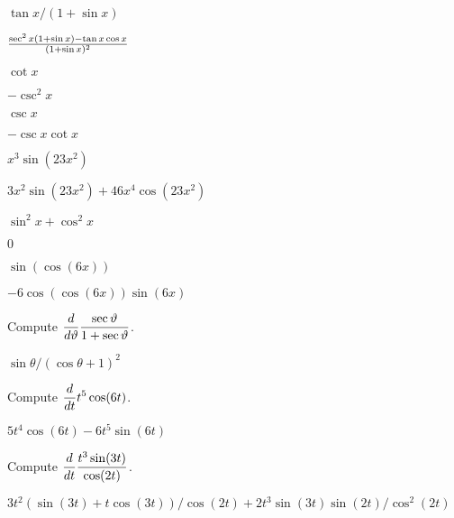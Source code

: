 \begin{exercises}
\begin{exercise} $\tan x/(1+\sin x)$
\begin{answer} ${\sec^2 x(1+\sin x)-\tan x \cos x\over (1+\sin x)^2}$
\end{answer}\end{exercise}

\begin{exercise} $\cot x$
\begin{answer} $ -\csc^2 x$
\end{answer}\end{exercise}

\begin{exercise} $\csc x$
\begin{answer} $ -\csc x\cot x$
\end{answer}\end{exercise}

\begin{exercise} $x^3 \sin (23x^2 )$
\begin{answer} $3x^2\sin(23x^2)+46x^4\cos(23x^2)$
\end{answer}\end{exercise}

\begin{exercise} $\sin ^2 x + \cos ^2 x$
 \begin{answer} $0$
\end{answer}\end{exercise}

\begin{exercise}  $\sin (\cos (6x) )$
 \begin{answer} $-6\cos(\cos(6x))\sin(6x)$
\end{answer}\end{exercise}

\endtwocol

\begin{exercise} Compute $\displaystyle{d\over d\vartheta}{\sec \vartheta\over 1+\sec \vartheta}$.
 \begin{answer} $\sin\theta/(\cos\theta+1)^2$
\end{answer}\end{exercise}

\begin{exercise} Compute $\displaystyle{d\over dt}t^5 \cos (6t)$.
\begin{answer} $5t^4\cos(6t)-6t^5\sin(6t)$
\end{answer}\end{exercise}

\begin{exercise} Compute $\displaystyle{d\over dt}{t^3 \sin (3t)\over\cos (2t)}$.
\begin{answer} $3t^2(\sin(3t)+t\cos(3t))/\cos(2t)+2t^3\sin(3t)\sin(2t)/\cos^2(2t)$
\end{answer}\end{exercise}


\end{exercises}
